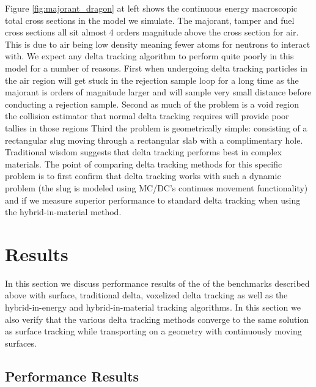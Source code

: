 Figure \ref{fig:majorant_dragon} at left shows the continuous energy macroscopic total cross sections in the model we simulate.
The majorant, tamper and fuel cross sections all sit almost 4 orders magnitude above the cross section for air.
This is due to air being low density meaning fewer atoms for neutrons to interact with.
We expect any delta tracking algorithm to perform quite poorly in this model for a number of reasons.
First when undergoing delta tracking particles in the air region will get stuck in the rejection sample loop for a long time as the majorant is orders of magnitude larger and will sample very small distance before conducting a rejection sample.
Second as much of the problem is a void region the collision estimator that normal delta tracking requires will provide poor tallies in those regions
Third the problem is geometrically simple: consisting of a rectangular slug moving through a rectangular slab with a complimentary hole.
Traditional wisdom suggests that delta tracking performs best in complex materials.
The point of comparing delta tracking methods for this specific problem is to first confirm that delta tracking works with such a dynamic problem (the slug is modeled using MC/DC's continues movement functionality) and if we measure superior performance to standard delta tracking when using the hybrid-in-material method.

\section{Results}



In this section we discuss performance results of the of the benchmarks described above with surface, traditional delta, voxelized delta tracking as well as the hybrid-in-energy and hybrid-in-material tracking algorithms.
In this section we also verify that the various delta tracking methods converge to the same solution as surface tracking while transporting on a geometry with continuously moving surfaces.

\subsection{Performance Results}

